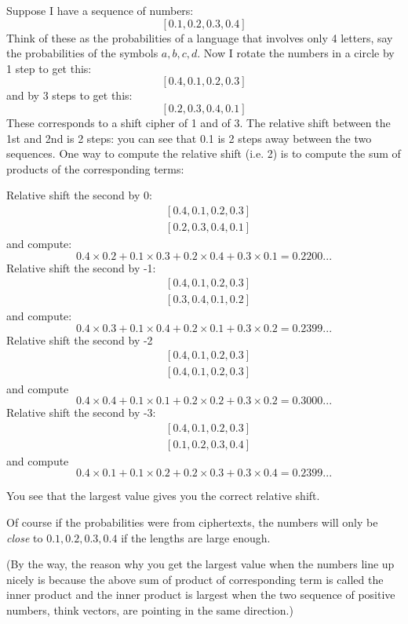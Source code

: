 Suppose I have a sequence of numbers:
\[
[0.1, 0.2, 0.3, 0.4]
\]
Think of these as the probabilities of a language that involves
only 4 letters, say the probabilities of the symbols $a,b,c,d$.
Now I rotate the numbers in a circle by 1 step to get this:
\[
[0.4, 0.1, 0.2, 0.3]
\]
and by 3 steps to get this:
\[
[0.2, 0.3, 0.4, 0.1]
\]
These corresponds to a shift cipher of 1 and of 3.
The relative shift between the 1st and 2nd is 2 steps:
you can see that 0.1 is 2 steps away between the two sequences.
One way to compute the relative shift (i.e. 2) is to 
compute the sum of products of the corresponding terms:
\begin{enumerate}
\li Relative shift the second by 0:
\begin{align*}
&[0.4, 0.1, 0.2, 0.3] \\
&[0.2, 0.3, 0.4, 0.1]
\end{align*}
and compute:
\[
0.4 \times 0.2 + 0.1 \times 0.3 + 0.2 \times 0.4 + 0.3 \times 0.1 = 0.2200...
\]
\li Relative shift the second by -1:
\begin{align*}
&[0.4, 0.1, 0.2, 0.3] \\
&[0.3, 0.4, 0.1, 0.2]
\end{align*}
and compute:
\[
0.4 \times 0.3 + 0.1 \times 0.4 + 0.2 \times 0.1 + 0.3 \times 0.2 = 0.2399...
\]
\li Relative shift the second by -2
\begin{align*}
&[0.4, 0.1, 0.2, 0.3]\\
&[0.4, 0.1, 0.2, 0.3]
\end{align*}
and compute
\[
0.4 \times 0.4 + 0.1 \times 0.1 + 0.2 \times 0.2 + 0.3 \times 0.2 = 0.3000...
\]
\li Relative shift the second by -3:
\begin{align*}
&[0.4, 0.1, 0.2, 0.3]\\
&[0.1, 0.2, 0.3, 0.4]
\end{align*}
and compute
\[
0.4 \times 0.1 + 0.1 \times 0.2 + 0.2 \times 0.3 + 0.3 \times 0.4 = 0.2399...
\]
\end{enumerate}
You see that the largest value gives you the correct relative shift.

Of course if the probabilities were from ciphertexts,
the numbers will only be
\textit{close} to $0.1,0.2,0.3,0.4$
if the lengths are large enough.
   
(By the way, the reason why you get the largest value
when the numbers line up nicely is because the
above sum of product of corresponding term is called
the inner product and the inner product
is largest when the two sequence of positive numbers, 
think vectors, are pointing in the same direction.)





